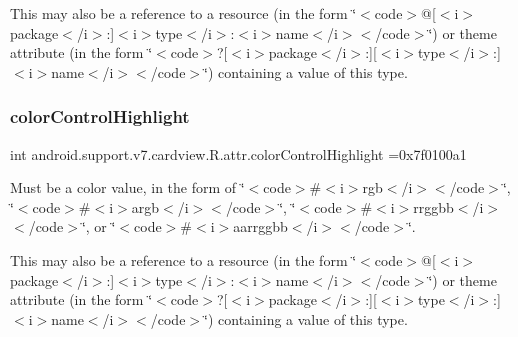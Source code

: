 This may also be a reference to a resource (in the form \char`\"{}$<$code$>$@\mbox{[}$<$i$>$package$<$/i$>$\+:\mbox{]}$<$i$>$type$<$/i$>$\+:$<$i$>$name$<$/i$>$$<$/code$>$\char`\"{}) or theme attribute (in the form \char`\"{}$<$code$>$?\mbox{[}$<$i$>$package$<$/i$>$\+:\mbox{]}\mbox{[}$<$i$>$type$<$/i$>$\+:\mbox{]}$<$i$>$name$<$/i$>$$<$/code$>$\char`\"{}) containing a value of this type. \mbox{\label{classandroid_1_1support_1_1v7_1_1cardview_1_1R_1_1attr_ac029806242aff5fd87d40c6135ca465d}} 
\subsubsection{\texorpdfstring{color\+Control\+Highlight}{colorControlHighlight}}
{\footnotesize\ttfamily int android.\+support.\+v7.\+cardview.\+R.\+attr.\+color\+Control\+Highlight =0x7f0100a1\hspace{0.3cm}{\ttfamily [static]}}

Must be a color value, in the form of \char`\"{}$<$code$>$\#$<$i$>$rgb$<$/i$>$$<$/code$>$\char`\"{}, \char`\"{}$<$code$>$\#$<$i$>$argb$<$/i$>$$<$/code$>$\char`\"{}, \char`\"{}$<$code$>$\#$<$i$>$rrggbb$<$/i$>$$<$/code$>$\char`\"{}, or \char`\"{}$<$code$>$\#$<$i$>$aarrggbb$<$/i$>$$<$/code$>$\char`\"{}. 

This may also be a reference to a resource (in the form \char`\"{}$<$code$>$@\mbox{[}$<$i$>$package$<$/i$>$\+:\mbox{]}$<$i$>$type$<$/i$>$\+:$<$i$>$name$<$/i$>$$<$/code$>$\char`\"{}) or theme attribute (in the form \char`\"{}$<$code$>$?\mbox{[}$<$i$>$package$<$/i$>$\+:\mbox{]}\mbox{[}$<$i$>$type$<$/i$>$\+:\mbox{]}$<$i$>$name$<$/i$>$$<$/code$>$\char`\"{}) containing a value of this type. \mbox{\label{classandroid_1_1support_1_1v7_1_1cardview_1_1R_1_1attr_a2e36c56263c970e32558384c77afe906}} 
